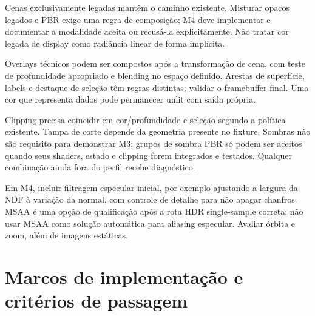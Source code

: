 \documentclass[11pt,a4paper]{article}
\begin{document}
Cenas exclusivamente legadas mantêm o caminho existente. Misturar opacos legados e PBR exige uma regra de composição; M4 deve implementar e documentar a modalidade aceita ou recusá-la explicitamente. Não tratar cor legada de display como radiância linear de forma implícita.

Overlays técnicos podem ser compostos após a transformação de cena, com teste de profundidade apropriado e blending no espaço definido. Arestas de superfície, labels e destaque de seleção têm regras distintas; validar o framebuffer final. Uma cor que representa dados pode permanecer unlit com saída própria.

Clipping precisa coincidir em cor/profundidade e seleção segundo a política existente. Tampa de corte depende da geometria presente no fixture. Sombras não são requisito para demonstrar M3; grupos de sombra PBR só podem ser aceitos quando seus shaders, estado e clipping forem integrados e testados. Qualquer combinação ainda fora do perfil recebe diagnóstico.

Em M4, incluir filtragem especular inicial, por exemplo ajustando a largura da NDF à variação da normal, com controle de detalhe para não apagar chanfros. MSAA é uma opção de qualificação após a rota HDR single-sample correta; não usar MSAA como solução automática para aliasing especular. Avaliar órbita e zoom, além de imagens estáticas.

\newpage
\section{Marcos de implementação e critérios de passagem}
\end{document}

